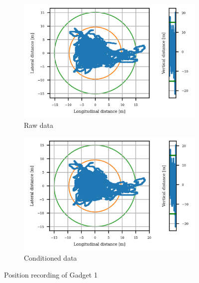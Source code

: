 \documentclass{article}
\begin{document}
			\begin{figure}[h]
		   		\centering
		     	\begin{subfigure}[b]{0.45\textwidth}
		      		\centering
		      	  	\includegraphics[width=\textwidth]{Static/raw_static_U-blox M8N.png}
		      	  	\caption{Raw data}
		     	\end{subfigure}
		     	\begin{subfigure}[b]{0.45\textwidth}
		      	   \centering
		      	   \includegraphics[width=\textwidth]{Static/cond_static_U-blox M8N.png}
		      	   \caption{Conditioned data}
		     	\end{subfigure}
		      \caption{Position recording of Gadget 1}
		      \label{fig:static_loc_gadget1}
			\end{figure}		
\end{document}
